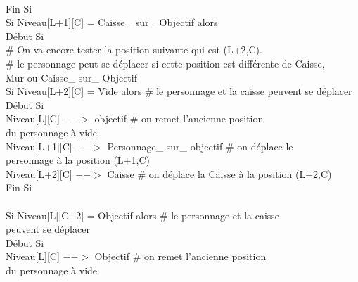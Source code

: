 \documentclass{article}
\begin{document}
\begin{tabbing}
\\	\hspace{3cm}	Fin Si 
\\	\hspace{3cm}	Si Niveau[L+1][C] = Caisse\_ sur\_ Objectif alors			
\\	\hspace{3cm}	Début Si
\\	\hspace{4cm}		\# On va encore tester la position suivante qui est (L+2,C). 
\\	\hspace{4cm}		\# le personnage peut se déplacer si cette position est différente de Caisse,
\\ \hspace{4cm} Mur ou Caisse\_ sur\_ Objectif
\\	\hspace{4cm}		Si Niveau[L+2][C] = Vide alors          \# le personnage et la caisse peuvent se déplacer
\\	\hspace{4cm}		Début Si
\\	\hspace{5cm}			Niveau[L][C] $-->$ objectif      		    \# on remet l'ancienne position
\\ \hspace{5cm} du personnage à vide
\\	\hspace{5cm}			Niveau[L+1][C] $-->$ Personnage\_ sur\_ objectif    \# on déplace le
\\ \hspace{5cm} personnage à la position (L+1,C)
\\	\hspace{5cm}			Niveau[L+2][C] $-->$ Caisse		      \# on déplace la Caisse à la position (L+2,C)
\\	\hspace{4cm}	Fin Si
\\
\\	\hspace{4cm}		Si Niveau[L][C+2] = Objectif alors         		\# le personnage et la caisse
\\ \hspace{4cm} peuvent se déplacer
\\	\hspace{4cm}		Début Si
\\	\hspace{5cm}			Niveau[L][C] $-->$ Objectif			\# on remet l'ancienne position
\\ \hspace{5cm} du personnage à vide

\end{tabbing}
\end{document}
